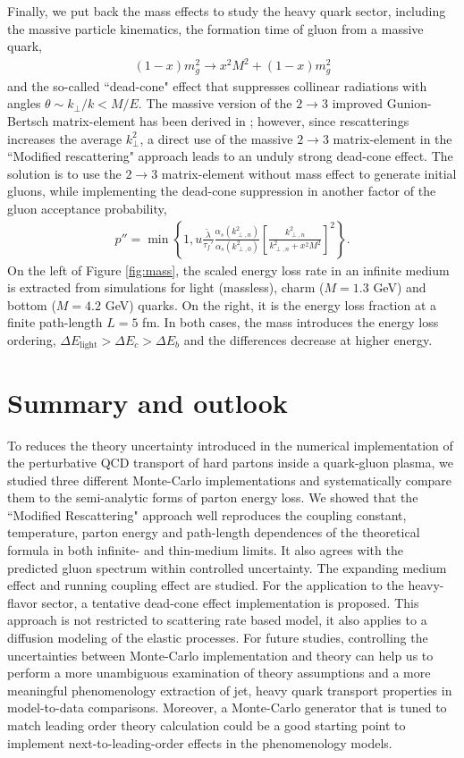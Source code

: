 \documentclass[aps, prc, reprint, amsmath, groupedaddress, nofootinbib]{revtex4-1}
\begin{document}
Finally, we put back the mass effects to study the heavy quark sector, including the massive particle kinematics, the formation time of gluon from a massive quark,
\begin{eqnarray}
(1-x)m_g^2 \rightarrow x^2M^2 + (1-x)m_g^2
\end{eqnarray}
and the so-called ``dead-cone" effect that suppresses collinear radiations with angles $\theta \sim k_\perp/k < M/E$. 
The massive version of the $2\rightarrow3$ improved Gunion-Bertsch matrix-element has been derived in \cite{Uphoff:2014hza}; however, since rescatterings increases the average $k_{\perp}^2$, a direct use of the massive $2\rightarrow3$ matrix-element in the ``Modified rescattering" approach leads to an unduly strong dead-cone effect.
The solution is to use the $2\rightarrow3$ matrix-element without mass effect to generate initial gluons, while implementing the dead-cone suppression in another factor of the gluon acceptance probability,
\begin{eqnarray}
p'' = \min\left\{1, u\frac{\tilde{\lambda}}{\tau_f'}\frac{\alpha_s(k_{\perp,n}^2)}{\alpha_s(k_{\perp,0}^2)} \left[\frac{k_{\perp,n}^2}{k_{\perp,n}^2+x^2 M^2}\right]^2\right\}.
\end{eqnarray}
On the left of Figure \ref{fig:mass}, the scaled energy loss rate in an infinite medium is extracted from simulations for light (massless), charm ($M=1.3$ GeV) and bottom ($M=4.2$ GeV) quarks. 
On the right, it is the energy loss fraction at a finite path-length $L=5$ fm.
In both cases, the mass introduces the energy loss ordering, $\Delta E_{\textrm{light}} > \Delta E_c > \Delta E_b$ and the differences decrease at higher energy.

\section{Summary and outlook}\label{section:summary}
To reduces the theory uncertainty introduced in the numerical implementation of the perturbative QCD transport of hard partons inside a quark-gluon plasma, we studied three different Monte-Carlo implementations and systematically compare them to the semi-analytic forms of parton energy loss.
We showed that the ``Modified Rescattering" approach well reproduces the coupling constant, temperature, parton energy and path-length dependences of the theoretical formula in both infinite- and thin-medium limits.
It also agrees with the predicted gluon spectrum within controlled uncertainty.
The expanding medium effect and running coupling effect are studied. For the application to the heavy-flavor sector, a tentative dead-cone effect implementation is proposed.
This approach is not restricted to scattering rate based model, it also applies to a diffusion modeling of the elastic processes. 
For future studies, controlling the uncertainties between Monte-Carlo implementation and theory can help us to perform a more unambiguous examination of theory assumptions and a more meaningful phenomenology extraction of jet, heavy quark transport properties in model-to-data comparisons.
Moreover, a Monte-Carlo generator that is tuned to match leading order theory calculation could be a good starting point to implement next-to-leading-order effects in the phenomenology models.
\end{document}
